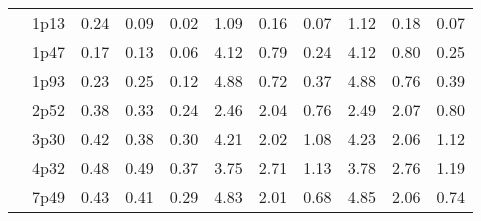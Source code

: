 \documentclass[12pt,A4paper]{article}
\begin{document}
\begin{table}[]
\begin{tabular}{lllllllllll}
\multicolumn{1}{|l|}{} & \multicolumn{1}{l|}{1p13} & \multicolumn{1}{c|}{0.24}        & \multicolumn{1}{c|}{0.09}         & \multicolumn{1}{c|}{0.02}        & \multicolumn{1}{c|}{1.09}         & \multicolumn{1}{c|}{0.16}        & \multicolumn{1}{c|}{0.07}        & \multicolumn{1}{c|}{1.12}        & \multicolumn{1}{c|}{0.18}        & \multicolumn{1}{c|}{0.07}         \\ \cline{2-11}
\multicolumn{1}{|l|}{} & \multicolumn{1}{l|}{1p47} & \multicolumn{1}{c|}{0.17}        & \multicolumn{1}{c|}{0.13}         & \multicolumn{1}{c|}{0.06}        & \multicolumn{1}{c|}{4.12}         & \multicolumn{1}{c|}{0.79}        & \multicolumn{1}{c|}{0.24}        & \multicolumn{1}{c|}{4.12}        & \multicolumn{1}{c|}{0.80}        & \multicolumn{1}{c|}{0.25}         \\ \cline{2-11}
\multicolumn{1}{|l|}{} & \multicolumn{1}{l|}{1p93} & \multicolumn{1}{c|}{0.23}        & \multicolumn{1}{c|}{0.25}         & \multicolumn{1}{c|}{0.12}        & \multicolumn{1}{c|}{4.88}         & \multicolumn{1}{c|}{0.72}        & \multicolumn{1}{c|}{0.37}        & \multicolumn{1}{c|}{4.88}        & \multicolumn{1}{c|}{0.76}        & \multicolumn{1}{c|}{0.39}         \\ \cline{2-11}
\multicolumn{1}{|l|}{} & \multicolumn{1}{l|}{2p52} & \multicolumn{1}{c|}{0.38}        & \multicolumn{1}{c|}{0.33}         & \multicolumn{1}{c|}{0.24}        & \multicolumn{1}{c|}{2.46}         & \multicolumn{1}{c|}{2.04}        & \multicolumn{1}{c|}{0.76}        & \multicolumn{1}{c|}{2.49}        & \multicolumn{1}{c|}{2.07}        & \multicolumn{1}{c|}{0.80}         \\ \cline{2-11}
\multicolumn{1}{|l|}{} & \multicolumn{1}{l|}{3p30} & \multicolumn{1}{c|}{0.42}        & \multicolumn{1}{c|}{0.38}         & \multicolumn{1}{c|}{0.30}        & \multicolumn{1}{c|}{4.21}         & \multicolumn{1}{c|}{2.02}        & \multicolumn{1}{c|}{1.08}        & \multicolumn{1}{c|}{4.23}        & \multicolumn{1}{c|}{2.06}        & \multicolumn{1}{c|}{1.12}         \\ \cline{2-11}
\multicolumn{1}{|l|}{} & \multicolumn{1}{l|}{4p32} & \multicolumn{1}{c|}{0.48}        & \multicolumn{1}{c|}{0.49}         & \multicolumn{1}{c|}{0.37}        & \multicolumn{1}{c|}{3.75}         & \multicolumn{1}{c|}{2.71}        & \multicolumn{1}{c|}{1.13}        & \multicolumn{1}{c|}{3.78}        & \multicolumn{1}{c|}{2.76}        & \multicolumn{1}{c|}{1.19}         \\ \cline{2-11}
\multicolumn{1}{|l|}{} & \multicolumn{1}{l|}{7p49} & \multicolumn{1}{c|}{0.43}        & \multicolumn{1}{c|}{0.41}         & \multicolumn{1}{c|}{0.29}        & \multicolumn{1}{c|}{4.83}         & \multicolumn{1}{c|}{2.01}        & \multicolumn{1}{c|}{0.68}        & \multicolumn{1}{c|}{4.85}        & \multicolumn{1}{c|}{2.06}        & \multicolumn{1}{c|}{0.74}         \\ \cline{2-11}

\end{tabular}
\end{table}
\end{document}
